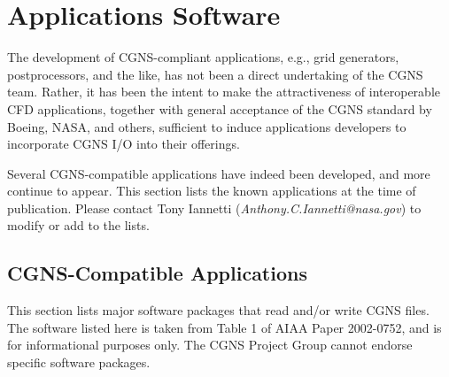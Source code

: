\section{Applications Software}
\label{s:applications}
\thispagestyle{plain}

The development of CGNS-compliant applications, e.g., grid generators,
postprocessors, and the like, has not been a direct undertaking of the
CGNS team.
Rather, it has been the intent to make the attractiveness of
interoperable CFD applications, together with general acceptance of
the CGNS standard by Boeing, NASA, and others, sufficient to induce
applications developers to incorporate CGNS I/O into their offerings.

Several CGNS-compatible applications have indeed been developed, and
more continue to appear.
This section lists the known applications at the time of publication.
Please contact Tony Iannetti (\textit{Anthony.C.Iannetti@nasa.gov})
to modify or add to the lists.

\subsection{CGNS-Compatible Applications}

This section lists major software packages that read and/or write
CGNS files.
The software listed here is taken from Table 1 of AIAA Paper 2002-0752,
and is for informational purposes only.
The CGNS Project Group cannot endorse specific software packages.

